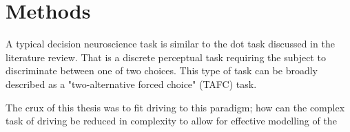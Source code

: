 \chapter{Methods}


A typical decision neuroscience task is similar to the dot task discussed in the literature review. That is a discrete perceptual task requiring the subject to discriminate between one of two choices. This type of task can be broadly described as a "two-alternative forced choice" (TAFC) task.

The crux of this thesis was to fit driving to this paradigm; how can the complex task of driving be reduced in complexity to allow for effective modelling of the


% 
